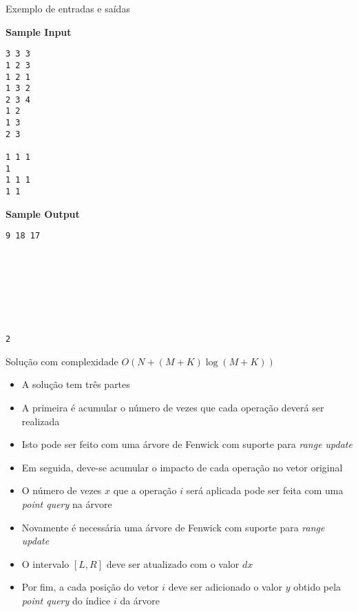 \begin{frame}[fragile]{Exemplo de entradas e saídas}

\begin{minipage}[t]{0.5\textwidth}
\textbf{Sample Input}
\begin{verbatim}
3 3 3
1 2 3
1 2 1
1 3 2
2 3 4
1 2
1 3
2 3

1 1 1
1
1 1 1
1 1
\end{verbatim}
\end{minipage}
\begin{minipage}[t]{0.45\textwidth}
\textbf{Sample Output}
\begin{verbatim}
9 18 17








2
\end{verbatim}
\end{minipage}
\end{frame}

\begin{frame}[fragile]{Solução com complexidade $O(N + (M + K)\log (M + K))$}

    \begin{itemize}
        \item A solução tem três partes

        \item A primeira é acumular o número de vezes que cada operação deverá ser realizada

        \item Isto pode ser feito com uma árvore de Fenwick com suporte para \textit{range update}

        \item Em seguida, deve-se acumular o impacto de cada operação no vetor original

        \item O número de vezes $x$ que a operação $i$ será aplicada pode ser feita com uma
            \textit{point query} na árvore

        \item Novamente é necessária uma árvore de Fenwick com suporte para \textit{range update}

        \item O intervalo $[L, R]$ deve ser atualizado com o valor $dx$

        \item Por fim, a cada posição do vetor $i$ deve ser adicionado o valor $y$ obtido
            pela \textit{point query} do índice $i$ da árvore
   \end{itemize}

\end{frame}


